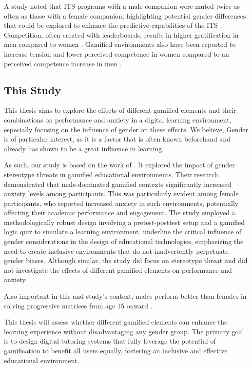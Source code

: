 A study noted that ITS programs with a male companion were muted twice as often as those with a female companion, highlighting potential gender differences that could be explored to enhance the predictive capabilities of the ITS \parencite{woolfAffectiveTutorsAutomatic2010}.
Competition, often created with leaderboards, results in higher gratification in men compared to women \parencite{lucasSexDifferencesVideo2004}.
Gamified environments also have been reported to increase tension and lower perceived competence in women compared to an perceived competence increase in men \parencite{laiszpedroDoesGamificationWork2015}.

\subsection{This Study}
This thesis aims to explore the effects of different gamified elements and their combinations on performance and anxiety in a digital learning environment, especially focusing on the influence of gender on these effects.
We believe, Gender is of particular interest, as it is a factor that is often known beforehand and already has shown to be a great influence in learning.

As such, our study is based on the work of \textcite{albuquerqueDoesGenderStereotype2017}.
It explored the impact of gender stereotype threats in gamified educational environments.
Their research demonstrated that male-dominated gamified contexts significantly increased anxiety levels among participants.
This was particularly evident among female participants, who reported increased anxiety in such environments, potentially affecting their academic performance and engagement.
The study employed a methodologically robust design involving a pretest-posttest setup and a gamified logic quiz to simulate a learning environment.
\textcite{albuquerqueDoesGenderStereotype2017} underline the critical influence of gender considerations in the design of educational technologies, emphasizing the need to create inclusive environments that do not inadvertently perpetuate gender biases. 
Although similar, the study did focus on stereotype threat and did not investigate the effects of different gamified elements on performance and anxiety.


Also important in this and \textcite{albuquerqueDoesGenderStereotype2017} study's context, males perform better than females in solving progressive matrices from age 15 onward \parencite{lynnSexDifferencesProgressive2004}.

This thesis will assess whether different gamified elements can enhance the learning experience without disadvantaging any gender group.
The primary goal is to design digital tutoring systems that fully leverage the potential of gamification to benefit all users equally, fostering an inclusive and effective educational environment.
